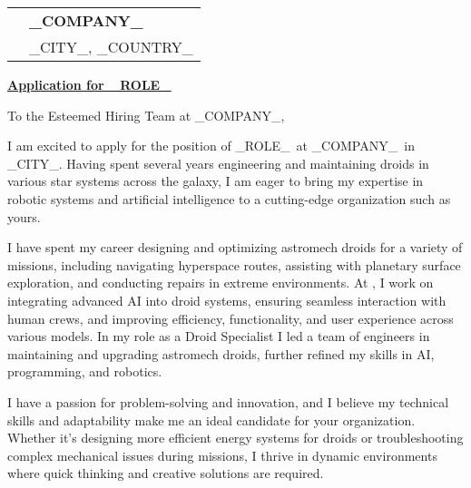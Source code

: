 \documentclass[10pt, a4paper]{article}
\begin{document}
\vspace{3cm}
\bigskip
\bigskip

\newcommand{\COMPANY}{_COMPANY_}
\newcommand{\ROLE}{_ROLE_}
\newcommand{\JobPostingURL}{_URL_}
\newcommand{\CITY}{_CITY_}
\newcommand{\COUNTRY}{_COUNTRY_}

\begin{tabular}{@{}p{0cm}l@{}} 
 & \textbf{\COMPANY} \\[0.8ex] 
 & \CITY, \COUNTRY
\end{tabular}

\bigskip %

\hfill {}

\noindent \textbf{\underline{Application for \href{\JobPostingURL}{\ROLE}}}

To the Esteemed Hiring Team at \COMPANY,

\bigskip

I am excited to apply for the position of \ROLE\ at \COMPANY\ in \CITY. Having spent several years engineering and maintaining droids in various star systems across the galaxy, I am eager to bring my expertise in robotic systems and artificial intelligence to a cutting-edge organization such as yours.

I have spent my career designing and optimizing astromech droids for a variety of missions, including navigating hyperspace routes, assisting with planetary surface exploration, and conducting repairs in extreme environments. At \currentEmployer, I work on integrating advanced AI into droid systems, ensuring seamless interaction with human crews, and improving efficiency, functionality, and user experience across various models. In my role as a Droid Specialist I led a team of engineers in maintaining and upgrading astromech droids, further refined my skills in AI, programming, and robotics.

I have a passion for problem-solving and innovation, and I believe my technical skills and adaptability make me an ideal candidate for your organization. Whether it’s designing more efficient energy systems for droids or troubleshooting complex mechanical issues during missions, I thrive in dynamic environments where quick thinking and creative solutions are required.
\end{document}
